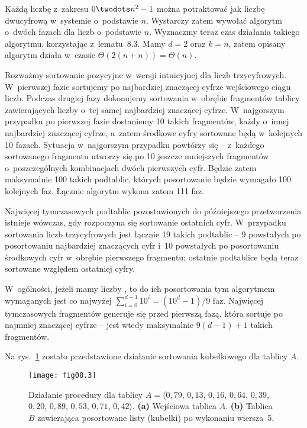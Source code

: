 \exercise %
Każdą liczbę z~zakresu $0\twodots n^2-1$ można potraktować jak liczbę dwucyfrową w~systemie o~podstawie $n$. Wystarczy zatem wywołać algorytm  o~dwóch fazach dla liczb o~podstawie $n$. Wyznaczmy teraz czas działania takiego algorytmu, korzystając z~lematu~8.3. Mamy $d=2$ oraz $k=n$, zatem opisany algorytm działa w~czasie $\Theta(2(n+n))=\Theta(n)$.

\exercise %
Rozważmy sortowanie pozycyjne w~wersji intuicyjnej dla liczb trzycyfrowych. W~pierwszej fazie sortujemy po najbardziej znaczącej cyfrze wejściowego ciągu liczb. Podczas drugiej fazy dokonujemy sortowania w~obrębie fragmentów tablicy zawierających liczby o~tej samej najbardziej znaczącej cyfrze. W~najgorszym przypadku po pierwszej fazie dostaniemy 10 takich fragmentów, każdy o~innej najbardziej znaczącej cyfrze, a~zatem środkowe cyfry sortowane będą w~kolejnych 10 fazach. Sytuacja w~najgorszym przypadku powtórzy się -- z~każdego sortowanego fragmentu utworzy się po 10 jeszcze mniejszych fragmentów o~poszczególnych kombinacjach dwóch pierwszych cyfr. Będzie zatem maksymalnie 100 takich podtablic, których posortowanie będzie wymagało 100 kolejnych faz. Łącznie algorytm wykona zatem 111 faz. 

Najwięcej tymczasowych podtablic pozostawionych do późniejszego przetworzenia istnieje wówczas, gdy rozpoczyna się sortowanie ostatnich cyfr. W~przypadku sortowania liczb trzycyfrowych jest łącznie 19 takich podtablic -- 9 powstałych po posortowaniu najbardziej znaczących cyfr i~10 powstałych po posortowaniu środkowych cyfr w~obrębie pierwszego fragmentu; ostatnie podtablice będą teraz sortowane względem ostatniej cyfry.

W~ogólności, jeżeli mamy liczby , to do ich posortowania tym algorytmem wymaganych jest co najwyżej $\sum_{i=0}^{d-1}10^i=(10^d-1)/9$ faz. Najwięcej tymczasowych fragmentów generuje się przed pierwszą fazą, która sortuje po najmniej znaczącej cyfrze -- jest wtedy maksymalnie $9(d-1)+1$ takich fragmentów.


\exercise %
Na rys.~\ref{fig:8.4-1} zostało przedstawione działanie sortowania kubełkowego dla tablicy $A$.
\begin{figure}[ht]
	\begin{center}
		\texttt{[image: fig08.3]}
	\end{center}
	\caption{Działanie procedury  dla tablicy $A=\langle0{,}79$, $0{,}13$, $0{,}16$, $0{,}64$, $0{,}39$, $0{,}20$, $0{,}89$, $0{,}53$, $0{,}71$, $0{,}42\rangle$. {\sffamily\bfseries(a)} Wejściowa tablica $A$. {\sffamily\bfseries(b)} Tablica $B$ zawierająca posortowane listy (kubełki) po wykonaniu wiersza~5.} \label{fig:8.4-1}
\end{figure}

